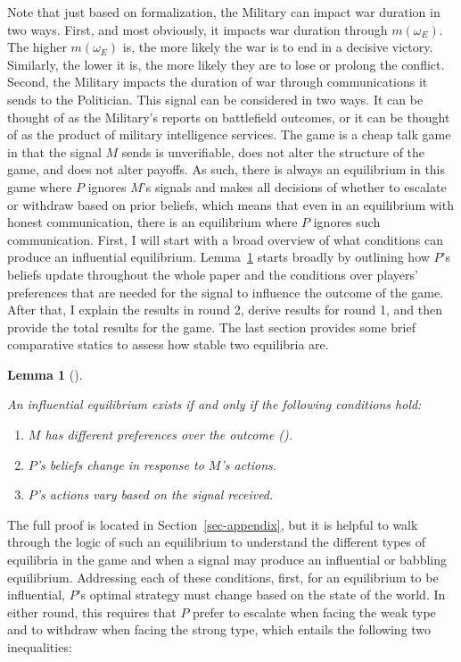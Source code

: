 \documentclass[
  12pt,
]{article}
\providecommand{\tightlist}{%
  \setlength{\itemsep}{0pt}\setlength{\parskip}{0pt}}\usepackage{longtable,booktabs,array}
\theoremstyle{plain}
\newtheorem{lemma}{Lemma}[section]
\theoremstyle{plain}
\theoremstyle{remark}
\begin{document}
Note that just based on formalization, the Military can impact war
duration in two ways. First, and most obviously, it impacts war duration
through \(m(\omega_E)\). The higher \(m(\omega_E)\) is, the more likely
the war is to end in a decisive victory. Similarly, the lower it is, the
more likely they are to lose or prolong the conflict. Second, the
Military impacts the duration of war through communications it sends to
the Politician. This signal can be considered in two ways. It can be
thought of as the Military's reports on battlefield outcomes, or it can
be thought of as the product of military intelligence services. The game
is a cheap talk game in that the signal \(M\) sends is unverifiable,
does not alter the structure of the game, and does not alter payoffs. As
such, there is always an equilibrium in this game where \(P\) ignores
\(M\)'s signals and makes all decisions of whether to escalate or
withdraw based on prior beliefs, which means that even in an equilibrium
with honest communication, there is an equilibrium where \(P\) ignores
such communication. First, I will start with a broad overview of what
conditions can produce an influential equilibrium.
Lemma~\ref{lem-nec_cond} starts broadly by outlining how \(P\)'s beliefs
update throughout the whole paper and the conditions over players'
preferences that are needed for the signal to influence the outcome of
the game. After that, I explain the results in round 2, derive results
for round 1, and then provide the total results for the game. The last
section provides some brief comparative statics to assess how stable two
equilibria are.

\begin{lemma}[]\protect\hypertarget{lem-nec_cond}{}\label{lem-nec_cond}

An influential equilibrium exists if and only if the following
conditions hold:

\begin{enumerate}
\def\labelenumi{\arabic{enumi}.}
\tightlist
\item
  \(M\) has different preferences over the outcome
  ().
\item
  \(P\)'s beliefs change in response to \(M\)'s actions.
\item
  \(P\)'s actions vary based on the signal received.
\end{enumerate}

\end{lemma}

The full proof is located in Section~\ref{sec-appendix}, but it is
helpful to walk through the logic of such an equilibrium to understand
the different types of equilibria in the game and when a signal may
produce an influential or babbling equilibrium. Addressing each of these
conditions, first, for an equilibrium to be influential, \(P\)'s optimal
strategy must change based on the state of the world. In either round,
this requires that \(P\) prefer to escalate when facing the weak type
and to withdraw when facing the strong type, which entails the following
two inequalities:
\end{document}

